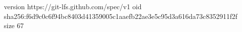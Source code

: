 version https://git-lfs.github.com/spec/v1
oid sha256:f6d9c0c6f94bc8403d41359005c1aaefb22ae3e5c95d3a616da73c8352911f2f
size 67
